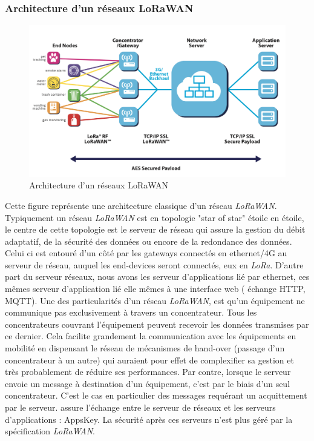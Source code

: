 \subsubsection{Architecture d'un réseaux LoRaWAN}
\begin{figure}[h!]
\centering
\includegraphics[scale=0.6]{networkArch.png}
\caption{Architecture d'un réseaux LoRaWAN}
\end{figure}
Cette figure représente une architecture classique d'un réseau  \textit{LoRaWAN}. Typiquement un réseau  \textit{LoRaWAN} est en topologie "star of star" étoile en étoile, le centre de cette topologie est le serveur de réseau qui assure la gestion du débit adaptatif, de la sécurité des données ou encore de la redondance des données. Celui ci est entouré d'un côté par les gateways connectés en ethernet/4G au serveur de réseau, auquel les end-devices seront connectés, eux en \textit{LoRa}. D'autre part du serveur réseaux, nous avons les serveur d'applications lié par ethernet, ces mêmes serveur d'application lié elle mêmes à une interface web ( échange HTTP, MQTT).
Une des particularités d’un réseau  \textit{LoRaWAN}, est qu’un équipement ne communique pas exclusivement à travers un concentrateur. Tous les concentrateurs couvrant l’équipement peuvent recevoir les données transmises par ce dernier.
Cela facilite grandement la communication avec les équipements en mobilité en dispensant le réseau de mécanismes de hand-over (passage d’un concentrateur à un autre) qui auraient pour effet de complexifier sa gestion et très probablement de réduire ses performances. Par contre, lorsque le serveur envoie un message à destination d’un équipement, c’est par le biais d’un seul concentrateur. C’est le cas en particulier des messages requérant un acquittement par le serveur.
 assure l'échange entre le serveur de réseaux et les serveurs d'applications : AppsKey. La sécurité après ces serveurs n'est plus géré par la spécification  \textit{LoRaWAN}.
 

